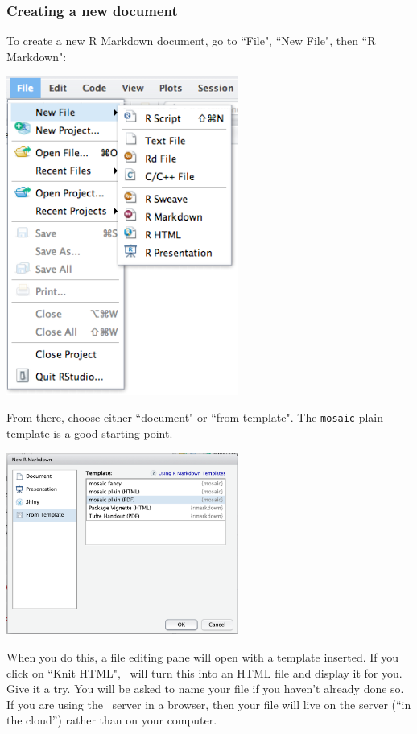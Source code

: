 \documentclass[twoside]{book}\usepackage[]{graphicx}\usepackage[]{xcolor}
\newcommand{\Rindex}[1]{\index{\texttt{#1}}}
\newcommand{\pkg}[1]{{\color{red!80!black}\texttt{#1}}\Rindex{#1}}
\begin{document}
\subsubsection{Creating a new document}
To create a new R Markdown document, go to ``File", ``New File", then ``R Markdown":
\begin{center}
	\includegraphics[width = 3in]{images/NewRMarkdown.png}
\end{center}

From there, choose either ``document" or ``from template".  The \pkg{mosaic} plain 
template is a good starting point.

\begin{center}
	\includegraphics[width = 3in]{images/FromTemplate.png}
\end{center}


When you do this, a file editing pane will open with a template inserted.  If
you click on ``Knit HTML", \RStudio\ will turn this into an HTML file and
display it for you.  Give it a try.  You will be asked to name your file if you
haven't already done so.  If you are using the \RStudio\ server in a browser,
then your file will live on the server (``in the cloud'') rather than on your
computer.
\end{document}
